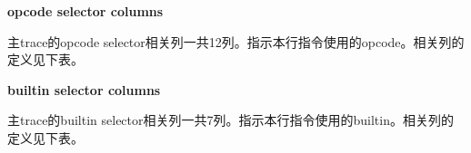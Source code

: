 \textbf{opcode selector columns}

主trace的opcode selector相关列一共12列。指示本行指令使用的opcode。相关列的定义见下表。
\begin{table}[!ht]
    \centering {}
    \caption{OlaVM的main trace表opcode selector相关列结构}
    \label{table: olavm-trace-table-opcode-selector}
\end{table}

\textbf{builtin selector columns}

主trace的builtin selector相关列一共7列。指示本行指令使用的builtin。相关列的定义见下表。
\begin{table}[!ht]
    \centering {}
    \caption{OlaVM的main trace表builtin selector相关列结构}
    \label{table: olavm-trace-table-builtin-selector}
\end{table}



